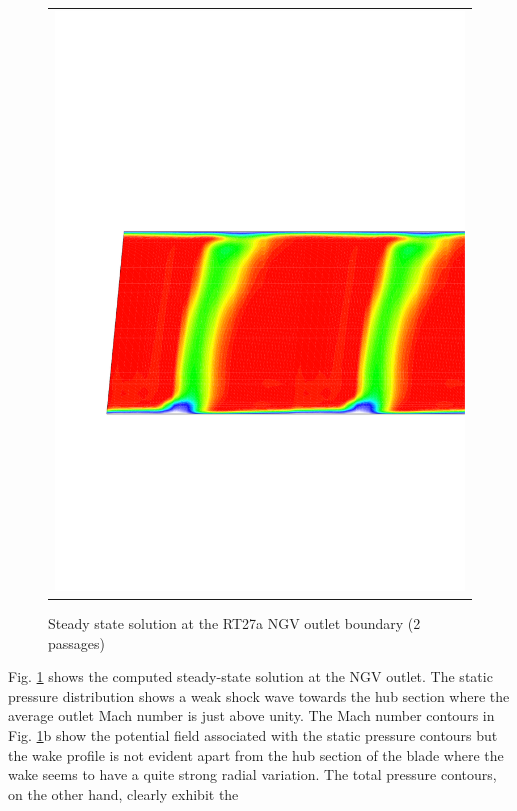 \begin{figure}
\begin{center}
\begin{tabular}{c}
       {\includegraphics[width=130mm,clip=t]{CHAP_RT27/FIGURE/ngvout_ptot.pdf}}
  \end{tabular}
 \end{center}
 \vspace{-8mm}
 \caption{Steady state solution at the RT27a NGV outlet boundary (2 passages)}
 \label{ngv_outlet_solution.fig}
\end{figure}
%
 Fig. \ref{ngv_outlet_solution.fig} shows the computed steady-state
 solution at the NGV outlet. The static pressure distribution shows a
 weak shock wave towards the hub section where the average outlet Mach number
 is just above unity.
 The Mach number contours in Fig. \ref{ngv_outlet_solution.fig}b
 show the potential field associated with the static pressure contours
 but the wake profile is not evident apart from the hub
 section of the blade where the wake seems to have a quite strong
 radial variation.
 The total pressure contours, on the other hand, clearly exhibit the
